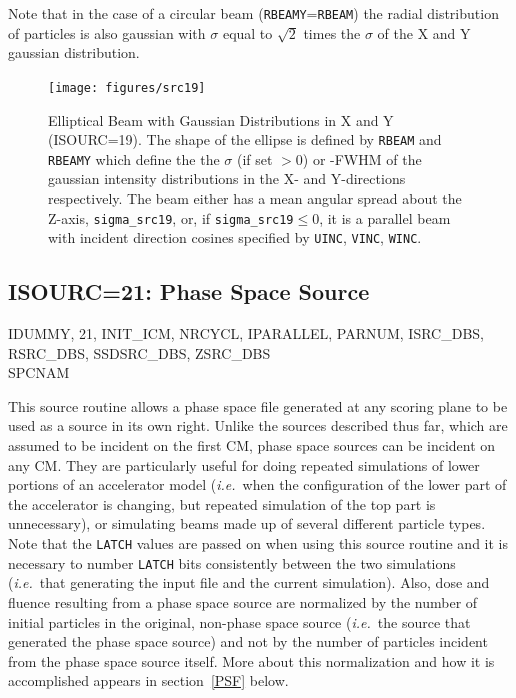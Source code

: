 \documentclass[12pt,twoside]{article}
\newcommand{\cen}[1]{\begin{center} #1 \end{center}                   }
\newcommand{\ie}{{\em i.e.}}
\begin{document}
Note that in the case of a circular beam ({\tt RBEAMY}={\tt RBEAM})
the radial distribution of particles is also gaussian with
$\sigma$ equal to $\sqrt{2}$ times the $\sigma$ of the X and Y gaussian distribution.
\begin{figure}[H]
\vspace*{-0.5cm}
\begin{center}
\leavevmode
\texttt{[image: figures/src19]}
\caption[ISOURC=19: Elliptical beam with gaussian distributions in X and Y.]
{Elliptical Beam with Gaussian Distributions in X and Y (ISOURC=19).  The shape
of the ellipse is defined by {\tt RBEAM} and {\tt RBEAMY} which define the
the $\sigma$ (if set $>$0) or -FWHM of the gaussian intensity
distributions in the X- and Y-directions respectively.
The beam either has a
mean angular spread about the Z-axis, {\tt sigma\_src19}, or, if
{\tt sigma\_src19}$\leq$0, it is a parallel beam with incident direction
cosines specified by {\tt UINC}, {\tt VINC}, {\tt WINC}.}
\label{fig_src19}
\end{center}
\end{figure}

\clearpage

\subsection{ISOURC=21: Phase Space Source}
\label{phspsrcsect}

\cen{IDUMMY, 21, INIT\_ICM, NRCYCL, IPARALLEL, PARNUM, ISRC\_DBS,
RSRC\_DBS, SSDSRC\_DBS, ZSRC\_DBS \\SPCNAM}


This source routine allows a phase space file generated at any scoring
plane to be used as a source in its own right.  Unlike the sources
described thus far, which are assumed to be
incident on the first CM, phase space
sources can be incident on any CM.  They are particularly useful for
doing repeated simulations of lower portions of an accelerator model (\ie\
when the configuration of the lower part of the accelerator is changing,
but repeated simulation of the top part is unnecessary), or simulating
beams made up of several different particle types.
Note that the
\verb+LATCH+ values are passed on when using this source routine and it
is necessary to number \verb+LATCH+ bits consistently between the two
simulations (\ie\ that generating the input file and the current
simulation).  Also, dose and fluence resulting from a phase space source
are normalized by the number of initial particles in the original, non-phase
space source (\ie\ the source that generated the phase space source) and not
by the number of particles incident from the phase space source itself.  More
about this normalization and how it is accomplished appears in section~\ref{PSF} below.
\index{LATCH!in ISOURC=21}
\end{document}
